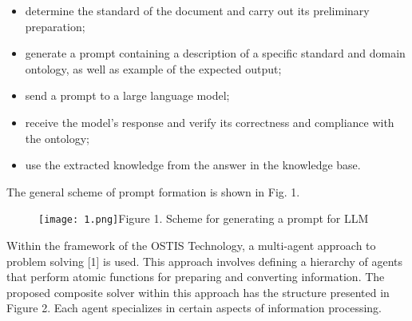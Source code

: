 \documentclass [11pt,a4paper]{article}
\begin{document}
\begin{multicols}{2}
\begin{itemize}\setlength{\parskip}{0cm}
    \item determine the standard of the document and carry
out its preliminary preparation;
    \item generate a prompt containing a description of a
specific standard and domain ontology, as well as
example of the expected output;
\item send a prompt to a large language model;
\item receive the model’s response and verify its correctness and compliance with the ontology;
\item use the extracted knowledge from the answer in the
knowledge base.
\end{itemize}
\par The general scheme of prompt formation is shown in
Fig. 1.

\begin{figure}[H]
    \centering
    \texttt{[image: 1.png]}\footnotesize\qquad Figure 1. Scheme for generating a prompt for LLM
\end{figure}
\par Within the framework of the OSTIS Technology, a
multi-agent approach to problem solving [1] is used. This
approach involves defining a hierarchy of agents that
perform atomic functions for preparing and converting
information. The proposed composite solver within this
approach has the structure presented in Figure 2. Each
agent specializes in certain aspects of information processing.

  
\end{multicols}
\end{document}

